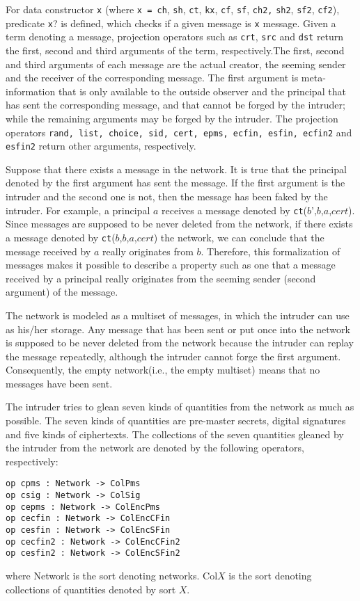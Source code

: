 \documentclass[a4paper,fleqn]{cas-dc}
\begin{document}
For data constructor \verb!x! (where \verb!x = ch!, \verb!sh!, \verb!ct!, \verb!kx!, \verb!cf!, \verb!sf!, \verb!ch2,! \verb!sh2!, \verb!sf2!, \verb!cf2!), predicate \verb!x!? is defined, which checks if a given message is \verb!x! message. Given a term denoting a message, projection operators such as \verb!crt!, \verb!src! and \verb!dst! return the first, second and third arguments of the term, respectively.The first, second and  third  arguments  of  each  message are  the  actual creator,  the  seeming  sender  and  the  receiver  of the  corresponding message. The first argument is meta-information that is only available to the outside observer and the principal that has sent the corresponding message, and that cannot be forged by the intruder; while the remaining arguments may be forged by the intruder. The projection operators \verb!rand, list, choice, sid, cert, epms, ecfin, esfin, ecfin2! and \verb!esfin2! return other arguments, respectively.

Suppose that there exists a message in the network. It is true that the principal denoted by the first
argument has sent the message. If the first argument is the
intruder and the second one is not, then the message has been
faked by the intruder. For example, a principal $a$ receives a message denoted by \verb!ct!($b$',$b$,$a$,$cert$). 
Since messages are supposed to be never deleted from the network, if there exists a message denoted by
\verb!ct!($b$,$b$,$a$,$cert$) the network, we can conclude that the message received by $a$ really originates from $b$.
Therefore, this formalization of messages makes it possible to describe a property such as one that a message received by a principal really originates from the seeming sender (second argument) of the message. 

The  network  is  modeled  as  a  multiset  of  messages,  in which the intruder can use as his/her storage. Any message that has been sent or put once into the network is supposed to be never deleted from the network because the intruder can replay the message repeatedly, although the intruder cannot forge the first argument. Consequently, the empty network(i.e., the empty multiset) means that no messages have been sent.

The intruder tries to glean seven kinds of quantities from
the network as much as possible. The seven kinds of quantities are pre-master secrets, digital signatures and five kinds of ciphertexts. The collections of the seven quantities gleaned by the intruder from the network are denoted by the following operators, respectively:
\begin{small}
\begin{verbatim}
op cpms : Network -> ColPms
op csig : Network -> ColSig
op cepms : Network -> ColEncPms
op cecfin : Network -> ColEncCFin
op cesfin : Network -> ColEncSFin
op cecfin2 : Network -> ColEncCFin2
op cesfin2 : Network -> ColEncSFin2
\end{verbatim}
\end{small}	
where Network is the sort denoting networks. Col$X$ is
the sort denoting collections of quantities denoted
by sort $X$.
\end{document}
